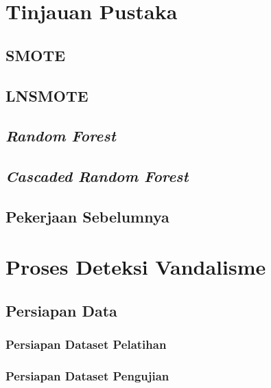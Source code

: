 \documentclass[12pt,a4paper,titlepage]{report}
\begin{document}
\chapter{Tinjauan Pustaka}

\section{SMOTE}

\newpage

\newpage

\section{LNSMOTE}

\newpage


\section{\textit{Random Forest}}



\section{\textit{Cascaded Random Forest}}



\newpage
\section{Pekerjaan Sebelumnya}


\chapter{Proses Deteksi Vandalisme}



\section{Persiapan Data}
\label{persiapan_data}


\subsection{Persiapan Dataset Pelatihan}


\subsection{Persiapan Dataset Pengujian}

\end{document}
